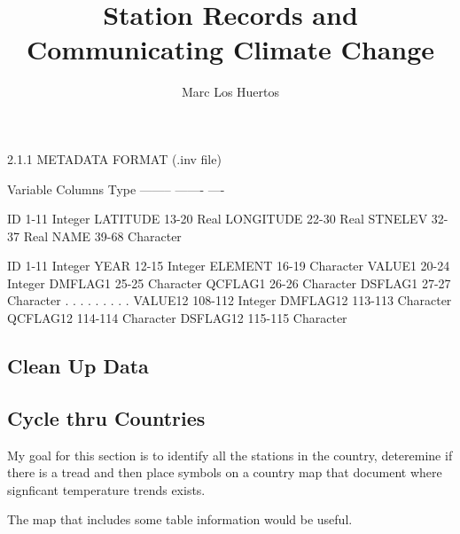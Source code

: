 \documentclass{article}
\title{Station Records and Communicating Climate Change}
\author{Marc Los Huertos}
\begin{document}
\maketitle



    2.1.1 METADATA FORMAT (.inv file)

       Variable          Columns      Type
       --------          -------      ----

       ID                 1-11        Integer
       LATITUDE          13-20        Real
       LONGITUDE         22-30        Real
       STNELEV           32-37        Real
       NAME              39-68        Character
       



          ID                 1-11        Integer
          YEAR              12-15        Integer
          ELEMENT           16-19        Character
          VALUE1            20-24        Integer
          DMFLAG1           25-25        Character
          QCFLAG1           26-26        Character
          DSFLAG1           27-27        Character
            .                 .             .
            .                 .             .
            .                 .             .
          VALUE12          108-112       Integer
          DMFLAG12         113-113       Character
          QCFLAG12         114-114       Character
          DSFLAG12         115-115       Character



\subsection{Clean Up Data}







\subsection{Cycle thru Countries}

My goal for this section is to identify all the stations in the country, deteremine if there is a tread and then place symbols on a country map that document where signficant temperature trends exists. 

The map that includes some table information would be useful. 
\begin{knitrout}
\color{fgcolor}\begin{kframe}


{\ttfamily\noindent\bfseries\color{errorcolor}{\#\# Error in aggregate.data.frame(mf[1L], mf[-1L], FUN = FUN, ...): no rows to aggregate}}\end{kframe}
\end{knitrout}
\end{document}
